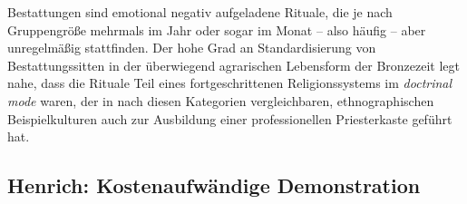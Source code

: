 \documentclass[openany,twoside,twocolumn]{book}
\begin{document}
Bestattungen sind emotional negativ aufgeladene Rituale, die je nach
Gruppengröße mehrmals im Jahr oder sogar im Monat -- also häufig -- aber
unregelmäßig stattfinden. Der hohe Grad an Standardisierung von
Bestattungssitten in der überwiegend agrarischen Lebensform der
Bronzezeit legt nahe, dass die Rituale Teil eines fortgeschrittenen
Religionssystems im \emph{doctrinal mode} waren, der in nach diesen
Kategorien vergleichbaren, ethnographischen Beispielkulturen auch zur
Ausbildung einer professionellen Priesterkaste geführt hat.

\hypertarget{henrich-kostenaufwandige-demonstration}{%
\subsection{Henrich: Kostenaufwändige
Demonstration}\label{henrich-kostenaufwandige-demonstration}}
\end{document}
